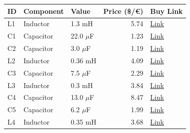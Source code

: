 \begin{table}[H]
    \centering
    \renewcommand{\arraystretch}{1.5}
    \begin{tabular}{@{}lllrl@{}}
        \toprule
        \textbf{ID} & \textbf{Component} & \textbf{Value} & \textbf{Price (\$/€)} & \textbf{Buy Link} \\
        \midrule
        L1 & Inductor & 1.3 mH & 5.74 & \href{https://www.soundimports.eu/en/jantzen-audio-000-2325.html}{Link} \\
        C1 & Capacitor & 22.0 $\mu$F & 1.23 & \href{https://www.soundimports.eu/en/it-intertechnik-elcr-22-100.html}{Link} \\
        C2 & Capacitor & 3.0 $\mu$F & 1.19 & \href{https://www.parts-express.com/Solen-3.0uF-400V-Polypropylene-Capacitor-027-542}{Link} \\
        L2 & Inductor & 0.36 mH & 4.09 & \href{https://www.soundimports.eu/en/jantzen-audio-000-0968.html}{Link} \\
        C3 & Capacitor & 7.5 $\mu$F & 2.29 & \href{https://www.parts-express.com/Solen-7.5uF-400V-Polypropylene-Capacitor-027-562}{Link} \\
        L3 & Inductor & 0.3 mH & 3.84 & \href{https://www.soundimports.eu/en/dayton-audio-ac20-3.html}{Link} \\
        C4 & Capacitor & 13.0 $\mu$F & 8.47 & \href{https://www.soundimports.eu/en/audyn-q4-13-0-400.html}{Link} \\
        C5 & Capacitor & 6.2 $\mu$F & 1.99 & \href{https://www.parts-express.com/Dayton-Audio-PMPC-6.2-6.2uF-250V-Precision-Audio-Capacitor-027-236}{Link} \\
        L4 & Inductor & 0.35 mH & 3.68 & \href{https://www.soundimports.eu/en/dayton-audio-ac20-35.html}{Link} \\
        \bottomrule
    \end{tabular}
\end{table}
